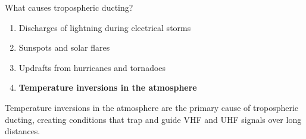 \begin{tcolorbox}[colback=gray!10!white,colframe=black!75!black,title={T3C08}]
    What causes tropospheric ducting?
    \begin{enumerate}[label=\Alph*),noitemsep]
        \item Discharges of lightning during electrical storms
        \item Sunspots and solar flares
        \item Updrafts from hurricanes and tornadoes
        \item \textbf{Temperature inversions in the atmosphere}
    \end{enumerate}
\end{tcolorbox}
Temperature inversions in the atmosphere are the primary cause of tropospheric ducting, creating conditions that trap and guide VHF and UHF signals over long distances.
